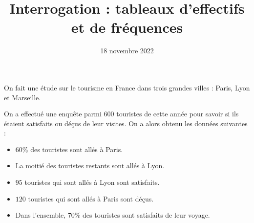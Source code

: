 \documentclass[
	classe=$1^{ere} STI2D$,
	headerTitle=Interrogation,
]{évaluation}
\title{Interrogation : tableaux d'effectifs et de fréquences}
\date{18 novembre 2022}
\begin{document}
\maketitle

On fait une étude sur le tourisme en France dans trois grandes villes : Paris, Lyon et Marseille.

On a effectué une enquête parmi $600$ touristes de cette année pour savoir si ils étaient satisfaits ou déçus de leur visites. On a alors obtenu les données suivantes :

\begin{itemize}
	\item $60 \%$ des touristes sont allés à Paris.
	\item La moitié des touristes restants sont allés à Lyon.
	\item $95$ touristes qui sont allés à Lyon sont satisfaits.
	\item $120$ touristes qui sont allés à Paris sont déçus.
	\item Dans l'ensemble, $70$\% des touristes sont satisfaits de leur voyage.
\end{itemize}
\end{document}
